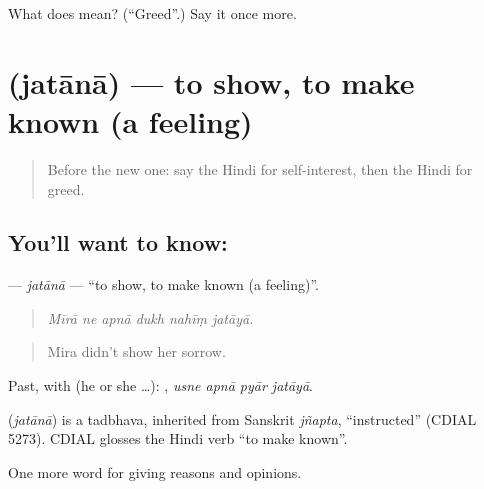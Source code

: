 \begin{tcolorbox}[breakable,colback=teal!4,colframe=teal!35!black,title={Before you move on}]
What does  mean? (\textquotedblleft{}Greed\textquotedblright{}.) Say it once more.
\end{tcolorbox}
\section[\texorpdfstring{\hi{जताना} (jatānā)}{जताना (jatānā)}]{ (jatānā) — to show, to make known (a feeling)}

\label{lesson:HI-C358-jatana}



\begin{quote}
Before the new one: say the Hindi for self-interest, then the Hindi for greed.
\end{quote}

\subsection*{You'll want to know: }
\textbf{} — \emph{jatānā} — \textquotedblleft{}to show, to make known (a feeling)\textquotedblright{}.

\begin{quote}
     
\end{quote}

\begin{quote}
\emph{Mīrā ne apnā dukh nahīṃ jatāyā.}
\end{quote}

\begin{quote}
Mira didn't show her sorrow.
\end{quote}

Past, with  (he or she …):    , \emph{usne apnā pyār jatāyā}.

\begin{cousinweb}
\textbf{} (\emph{jatānā}) is a tadbhava, inherited from Sanskrit \emph{jñapta}, \textquotedblleft{}instructed\textquotedblright{} (CDIAL 5273). CDIAL glosses the Hindi verb \textquotedblleft{}to make known\textquotedblright{}.
\end{cousinweb}

\begin{grammarlens}[title={What you've built}]
One more word for giving reasons and opinions.
\end{grammarlens}

